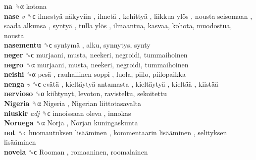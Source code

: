 \textbf{na} ␝α  kotona  \\
\textbf{nase} \emph{v}  ␝ϲ   ilmestyä näkyviin ,  ilmetä ,  kehittyä ,  liikkua ylös ,  nousta seisomaan ,  saada alkunsa ,  syntyä ,  tulla ylös , ilmaantua, kasvaa, kohota, muodostua, nousta  \\
\textbf{nasementu} ␝ϲ   syntymä , alku, synnytys, synty  \\
\textbf{neger} ␝ϲ  murjaani, musta, neekeri, negroidi, tummaihoinen  \\
\textbf{negro} ␝α  murjaani, musta, neekeri, negroidi, tummaihoinen  \\
\textbf{neishi} ␝α   pesä ,  rauhallinen soppi , luola, piilo, piilopaikka  \\
\textbf{nenga} \emph{v}  ␝ϲ   evätä ,  kieltäytyä antamasta ,  kieltäytyä ,  kieltää ,  kiistää   \\
\textbf{nervioso} ␝α  kiihtynyt, levoton, ravisteltu, sekoitettu  \\
\textbf{Nigeria} ␝α   Nigeria ,  Nigerian  liittotasavalta   \\
\textbf{niuskir} \emph{adj}  ␝ϲ   innoissaan oleva , innokas  \\
\textbf{Noruega} ␝α   Norja ,  Norjan  kuningaskunta   \\
\textbf{not} ␝ϲ   huomautuksen lisääminen ,  kommentaarin lisääminen ,  selityksen lisääminen   \\
\textbf{novela} ␝ϲ   Rooman , romaaninen, roomalainen  \\
